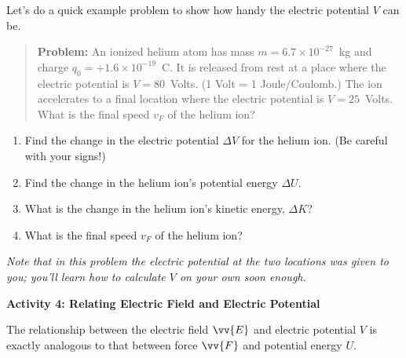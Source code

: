 Let's do a quick example problem to show how handy the electric potential $V$ can be.  
\begin{quote}
\textbf{Problem:} An ionized helium atom has mass $m=6.7\times 10^{-27}$~kg and charge $q_0=+1.6\times 10^{-19}$~C.  It is released from rest at a place where the electric potential is $V = 80$~Volts.  (1 Volt = 1 Joule/Coulomb.)  The ion accelerates to a final location where the electric potential is $V= 25$~Volts.  What is the final speed $v_F$ of the helium ion?  
\end{quote}
\begin{enumerate}[labparts]
\item Find the change in the electric potential $\Delta V$ for the helium ion.  (Be careful with your signs!)
\answerspace{0.3in}

\item Find the change in the helium ion's potential energy $\Delta U$.  
\answerspace{0.3in}

\item What is the change in the helium ion's kinetic energy, $\Delta K$? 
\answerspace{0.3in}

\item What is the final speed $v_F$ of the helium ion?
\answerspace{0.6in}

\end{enumerate}
\textit{Note that in this problem the electric potential at the two locations was given to you; you'll learn how to calculate $V$ on your own soon enough.}

\bigskip
\textbf{Activity 4: Relating Electric Field and Electric Potential}

The relationship between the electric field $\vv{E}$ and electric potential $V$ is exactly analogous to that between force $\vv{F}$ and potential energy $U$.  

